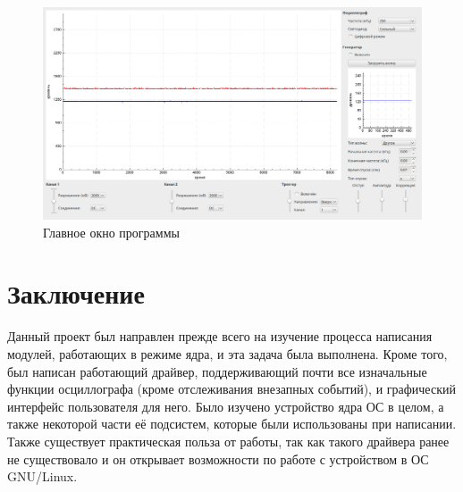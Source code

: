\documentclass[a4paper,12pt]{report}
\numberwithin{equation}{section}
\begin{document}
\begin{figure}[h!]
\centering
\includegraphics[width=\textwidth]{mysoft}
\caption{Главное окно программы}
\label{mysoft}
\end{figure}

\newpage
\section*{Заключение}
Данный проект был направлен прежде всего на изучение процесса написания модулей,
работающих в режиме ядра, и эта задача была выполнена. Кроме того, был написан
работающий драйвер, поддерживающий почти все изначальные функции осциллографа
(кроме отслеживания внезапных событий), и графический интерфейс пользователя для
него. Было изучено устройство ядра ОС в целом, а также некоторой части её
подсистем, которые были использованы при написании. Также существует
практическая польза от работы, так как такого драйвера ранее не существовало и
он открывает возможности по работе с устройством в ОС GNU/Linux.

\newpage
\printbibliography[heading=bibintoc]
\end{document}
